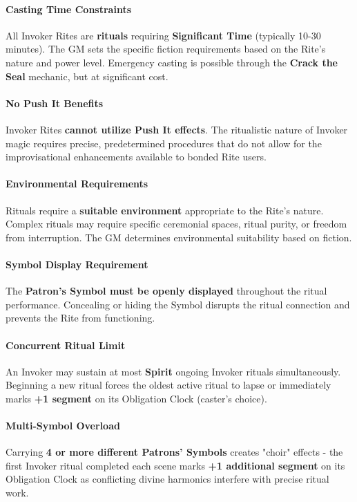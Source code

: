 \documentclass[12pt,twoside]{book}
\begin{document}
\paragraph{Casting Time Constraints} All Invoker Rites are \textbf{rituals} requiring \textbf{Significant Time} (typically 10-30 minutes). The GM sets the specific fiction requirements based on the Rite's nature and power level. Emergency casting is possible through the \textbf{Crack the Seal} mechanic, but at significant cost.

\paragraph{No Push It Benefits} Invoker Rites \textbf{cannot utilize Push It effects}. The ritualistic nature of Invoker magic requires precise, predetermined procedures that do not allow for the improvisational enhancements available to bonded Rite users.

\paragraph{Environmental Requirements} Rituals require a \textbf{suitable environment} appropriate to the Rite's nature. Complex rituals may require specific ceremonial spaces, ritual purity, or freedom from interruption. The GM determines environmental suitability based on fiction.

\paragraph{Symbol Display Requirement} The \textbf{Patron's Symbol must be openly displayed} throughout the ritual performance. Concealing or hiding the Symbol disrupts the ritual connection and prevents the Rite from functioning.

\paragraph{Concurrent Ritual Limit} An Invoker may sustain at most \textbf{Spirit} ongoing Invoker rituals simultaneously. Beginning a new ritual forces the oldest active ritual to lapse or immediately marks \textbf{+1 segment} on its Obligation Clock (caster's choice).

\paragraph{Multi-Symbol Overload} Carrying \textbf{4 or more different Patrons' Symbols} creates "choir" effects - the first Invoker ritual completed each scene marks \textbf{+1 additional segment} on its Obligation Clock as conflicting divine harmonics interfere with precise ritual work.
\end{document}
